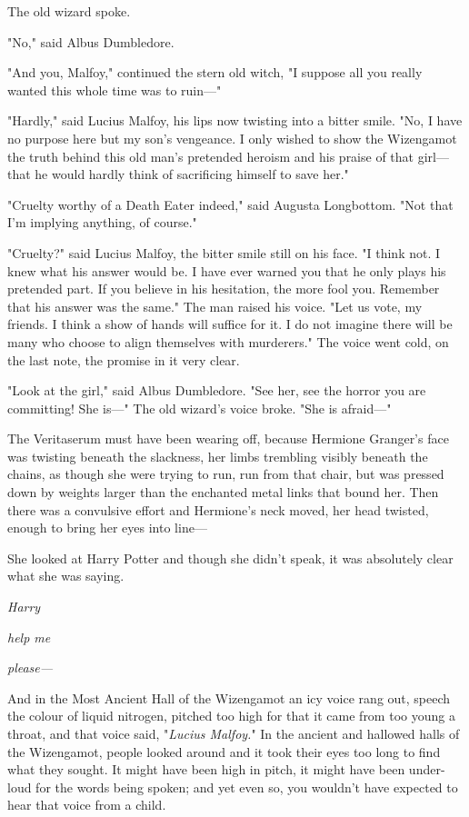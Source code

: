 The old wizard spoke.

"No," said Albus Dumbledore.

"And you, Malfoy," continued the stern old witch, "I suppose all you really
wanted this whole time was to ruin—"

"Hardly," said Lucius Malfoy, his lips now twisting into a bitter smile. "No, I
have no purpose here but my son’s vengeance. I only wished to show the
Wizengamot the truth behind this old man’s pretended heroism and his praise of
that girl—that he would hardly think of sacrificing himself to save her."

"Cruelty worthy of a Death Eater indeed," said Augusta Longbottom. "Not that
I’m implying anything, of course."

"Cruelty?" said Lucius Malfoy, the bitter smile still on his face. "I think
not. I knew what his answer would be. I have ever warned you that he only plays
his pretended part. If you believe in his hesitation, the more fool you.
Remember that his answer was the same." The man raised his voice. "Let us vote,
my friends. I think a show of hands will suffice for it. I do not imagine there
will be many who choose to align themselves with murderers." The voice went
cold, on the last note, the promise in it very clear.

"Look at the girl," said Albus Dumbledore. "See her, see the horror you are
committing! She is—" The old wizard’s voice broke. "She is afraid—"

The Veritaserum must have been wearing off, because Hermione Granger’s face was
twisting beneath the slackness, her limbs trembling visibly beneath the chains,
as though she were trying to run, run from that chair, but was pressed down by
weights larger than the enchanted metal links that bound her. Then there was a
convulsive effort and Hermione’s neck moved, her head twisted, enough to bring
her eyes into line—

She looked at Harry Potter and though she didn’t speak, it was absolutely clear
what she was saying.

\emph{Harry}

\emph{help me}

\emph{please—}

And in the Most Ancient Hall of the Wizengamot an icy voice rang out, speech
the colour of liquid nitrogen, pitched too high for that it came from too young
a throat, and that voice said, "\emph{Lucius Malfoy.}"
\later
In the ancient and hallowed halls of the Wizengamot, people looked around and
it took their eyes too long to find what they sought. It might have been high
in pitch, it might have been under-loud for the words being spoken; and yet
even so, you wouldn’t have expected to hear that voice from a child.

